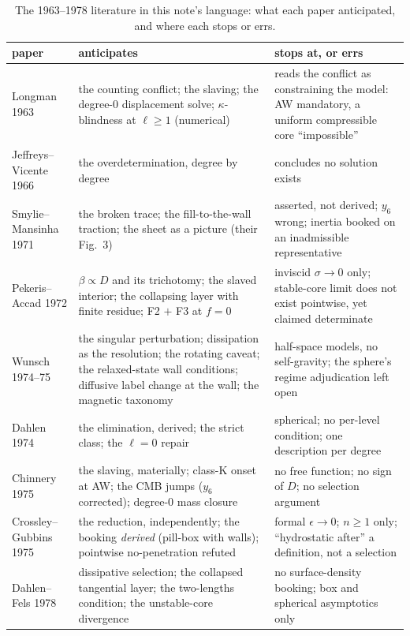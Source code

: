 \documentclass[11pt]{article}
\theoremstyle{definition}
\theoremstyle{remark}
\begin{document}
\begin{table}[htbp]
\centering\small
\caption{The 1963--1978 literature in this note's language: what each
paper anticipated, and where each stops or errs.}
\label{tab:literature}
\begin{tabular}{@{}p{}p{}p{}@{}}
\toprule
paper & anticipates & stops at, or errs \\
\midrule
Longman 1963 & the counting conflict; the slaving; the degree-0
displacement solve; $\kappa$-blindness at $\ell \ge 1$ (numerical) &
reads the conflict as constraining the model: AW mandatory, a uniform
compressible core ``impossible'' \\
Jeffreys--Vicente 1966 & the overdetermination, degree by degree &
concludes no solution exists \\
Smylie--Mansinha 1971 & the broken trace; the fill-to-the-wall
traction; the sheet as a picture (their Fig.~3) & asserted, not
derived; $y_6$ wrong; inertia booked on an inadmissible representative \\
Pekeris--Accad 1972 & $\beta \propto D$ and its trichotomy; the slaved
interior; the collapsing layer with finite residue; F2 $+$ F3 at $f =
0$ & inviscid $\sigma \to 0$ only; stable-core limit does not exist
pointwise, yet claimed determinate \\
Wunsch 1974--75 & the singular perturbation; dissipation as the
resolution; the rotating caveat; the relaxed-state wall conditions;
diffusive label change at the wall; the magnetic taxonomy & half-space
models, no self-gravity; the sphere's regime adjudication left open \\
Dahlen 1974 & the elimination, derived; the strict class; the $\ell =
0$ repair & spherical; no per-level condition; one description per
degree \\
Chinnery 1975 & the slaving, materially; class-K onset at AW; the CMB
jumps ($y_6$ corrected); degree-0 mass closure & no free function; no
sign of $D$; no selection argument \\
Crossley--Gubbins 1975 & the reduction, independently; the booking
\emph{derived} (pill-box with walls); pointwise no-penetration refuted
& formal $\epsilon \to 0$; $n \ge 1$ only; ``hydrostatic after'' a
definition, not a selection \\
Dahlen--Fels 1978 & dissipative selection; the collapsed tangential
layer; the two-lengths condition; the unstable-core divergence & no
surface-density booking; box and spherical asymptotics only \\
\bottomrule
\end{tabular}
\end{table}
\end{document}
